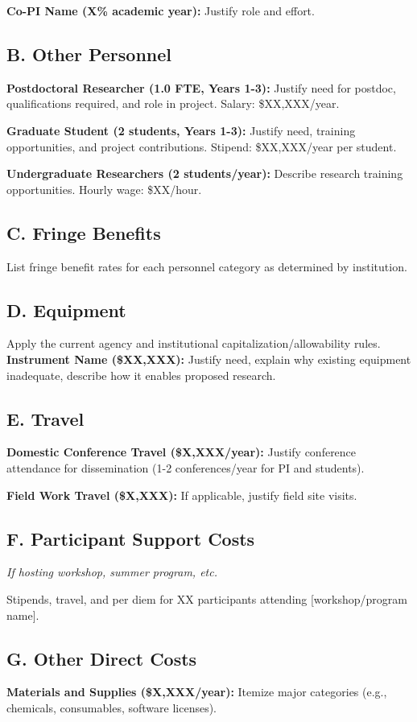 \documentclass[11pt,letterpaper]{article}
\begin{document}
\textbf{Co-PI Name (X\% academic year):} Justify role and effort.

\subsection*{B. Other Personnel}
\textbf{Postdoctoral Researcher (1.0 FTE, Years 1-3):} Justify need for postdoc, qualifications required, and role in project. Salary: \$XX,XXX/year.

\textbf{Graduate Student (2 students, Years 1-3):} Justify need, training opportunities, and project contributions. Stipend: \$XX,XXX/year per student.

\textbf{Undergraduate Researchers (2 students/year):} Describe research training opportunities. Hourly wage: \$XX/hour.

\subsection*{C. Fringe Benefits}
List fringe benefit rates for each personnel category as determined by institution.

\subsection*{D. Equipment}
Apply the current agency and institutional capitalization/allowability rules.
\textbf{Instrument Name (\$XX,XXX):} Justify need, explain why existing equipment inadequate, describe how it enables proposed research.

\subsection*{E. Travel}
\textbf{Domestic Conference Travel (\$X,XXX/year):} Justify conference attendance for dissemination (1-2 conferences/year for PI and students).

\textbf{Field Work Travel (\$X,XXX):} If applicable, justify field site visits.

\subsection*{F. Participant Support Costs}
\textit{If hosting workshop, summer program, etc.}

Stipends, travel, and per diem for XX participants attending [workshop/program name].

\subsection*{G. Other Direct Costs}
\textbf{Materials and Supplies (\$X,XXX/year):} Itemize major categories (e.g., chemicals, consumables, software licenses).
\end{document}
